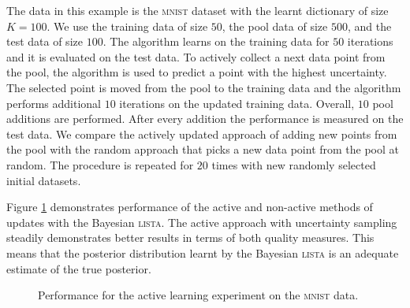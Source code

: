\documentclass{article}
\begin{document}
The data in this example is the \textsc{mnist} dataset with the learnt dictionary of size $K=100$. We use the training data of size $50$, the pool data of size $500$,  and the test data of size $100$. The algorithm learns on the training data for $50$ iterations and it is evaluated on the test data. To actively collect a next data point from the pool, the algorithm is used to predict a point with the highest uncertainty. The selected point is moved from the pool to the training data and the algorithm performs additional $10$ iterations on the updated training data. Overall, $10$ pool additions are performed. After every addition the performance is measured on the test data. We compare the actively updated approach of adding new points from the pool with the random approach that picks a new data point from the pool at random. The procedure is repeated for $20$ times with new randomly selected initial datasets.

Figure \ref{fig:active_learning_mnist} demonstrates performance of the active and non-active methods of updates with the Bayesian \textsc{lista}. The active approach with uncertainty sampling steadily demonstrates better results in terms of both quality measures. This means that the posterior distribution learnt by the Bayesian \textsc{lista} is an adequate estimate of the true posterior.
\begin{figure}[t]
\centering
{}%
\caption{Performance for the active learning experiment on the \textsc{mnist} data. }
\label{fig:active_learning_mnist}
\end{figure}
\end{document}
